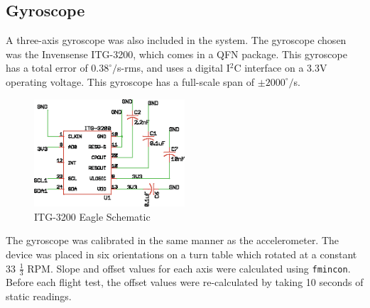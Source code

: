 \subsection*{Gyroscope}
A three-axis gyroscope was also included in the system. The gyroscope chosen was the Invensense ITG-3200, which comes in a QFN package. This gyroscope has a total error of $0.38^\circ/$s-rms\cite{itg3200DataSheet}, and uses a digital I$^2$C interface on a 3.3V operating voltage. This gyroscope has a full-scale span of $\pm2000^\circ/$s.

\begin{figure}[H]

  \centering
    \includegraphics[width=0.5\textwidth]{figures/itg3200Schematic.eps}
      \caption{ITG-3200 Eagle Schematic} \label{itg3200Schematic}
\end{figure}

The gyroscope was calibrated in the same manner as the accelerometer. The device was placed in six orientations on a turn table which rotated at a constant 33 $\frac{1}{3}$ RPM. Slope and offset values for each axis were calculated using \texttt{fmincon}. Before each flight test, the offset values were re-calculated by taking 10 seconds of static readings.\\

